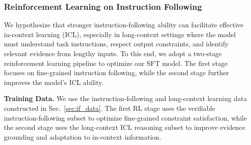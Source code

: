 \subsubsection{Reinforcement Learning on Instruction Following}

We hypothesize that stronger instruction-following ability can facilitate effective in-context learning (ICL), especially in long-context settings where the model must understand task instructions, respect output constraints, and identify relevant evidence from lengthy inputs. To this end, we adopt a two-stage reinforcement learning pipeline to optimize our SFT model. The first stage focuses on fine-grained instruction following, while the second stage further improves the model's ICL ability.

\textbf{Training Data.}
We use the instruction-following and long-context learning data constructed in Sec.~\ref{sec:if_data}. The first RL stage uses the verifiable instruction-following subset to optimize fine-grained constraint satisfaction, while the second stage uses the long-context ICL reasoning subset to improve evidence grounding and adaptation to in-context information.



